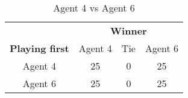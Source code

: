 \begin{table}[!h]
	\centering
	\label{result:Ag3vsAg4}
	\begin{tabular}{c | c | c | c}
		& \multicolumn{3}{c}{\textbf{Winner}}        \\
		\textbf{Playing first} & Agent 4 & Tie & Agent 6 \\ \hline
		Agent 4 & 25 & 0 & 25 \\ \hline
		Agent 6 & 25 & 0 & 25
	\end{tabular}
	\caption{Agent 4 vs Agent 6}
\end{table}
